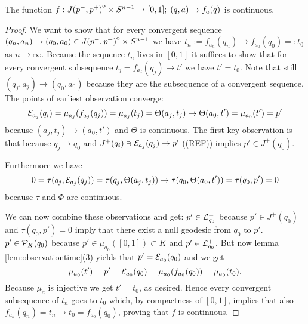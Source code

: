 \begin{proposition}\label{prop:fcont} 
    The function $f:{\kern0ptJ(p^-,p^+)}^{\mathrm{o}}\times{S^{n-1}}\to[0,1];\; (q,a)\mapsto f_a(q)$ is continuous.
\end{proposition}
\begin{proof}
    We want to show that for every convergent sequence $(q_n,a_n)\to (q_0,a_0)\in {\kern0ptJ(p^-,p^+)}^{\mathrm{o}}\times {S^{n-1}}$ we have $t_n:=f_{a_n}(q_n)\to f_{a_0}(q_0)=:t_0$ as $n \to \infty$. Because the sequence $t_n$ lives in $[0,1]$ it suffices to show that for every convergent subsequence $t_j = f_{a_j}(q_j) \to t'$ we have $t'=t_0$. Note that still $(q_j,a_j)\to (q_0,a_0)$ because they are the subsequence of a convergent sequence. The points of earliest observation converge:
    \[
        {\mathcal{E}}_{a_j}(q_i) = \mu_{a_j}(f_{a_j}(q_j)) = \mu_{a_j}(t_j) = \Theta(a_j,t_j) \to \Theta(a_0,t') = \mu_{a_0}(t')=p'
    \] because $(a_j,t_j)\to (a_0,t')$ and $\Theta$ is continuous.
    The first key observation is that  because $q_j\to q_0$ and $J^+(q_i)\ni{\mathcal{E}}_{a_j}(q_j) \to  p'$ ((REF)) implies $p'\in J^+(q_0)$.

    Furthermore we have
    \[
        0=\tau(q_j,{\mathcal{E}}_{a_j}(q_j))=\tau(q_j,\Theta(a_j,t_j))\to \tau(q_0,\Theta(a_0,t')) = \tau(q_0,p')=0
    \] because $\tau$ and $\Phi$ are continuous.

    We can now combine these observations and get: $p'\in {\mathcal{L}}^+_{q_0}$ because $p'\in J^+(q_0)$ and $\tau(q_0,p')=0$ imply that there exist a null geodesic from $q_0$ to $p'$. $p'\in {\mathcal{P}}_K(q_0)$ because $p'\in \mu_{a_0}([0,1])\subset K$ and $p'\in {\mathcal{L}}^+_{q_0}$. But now lemma \ref{lem:observationtime}(3) yields that $p'={\mathcal{E}}_{a_0}(q_0)$ and we get 
    \[
        \mu_{a_0}(t') = p' = {\mathcal{E}}_{a_0}(q_0) = \mu_{a_0}(f_{a_0}(q_0))= \mu_{a_0}(t_0).
    \]
    Because $\mu_a$ is injective we get $t'=t_0$, as desired. Hence every convergent subsequence of $t_n$ goes to $t_0$ which, by compactness of $[0,1]$, implies that also $f_{a_n}(q_n)=t_n \to t_0 = f_{a_0}(q_0)$, proving that $f$ is continuous.
    \newpage
\end{proof}

